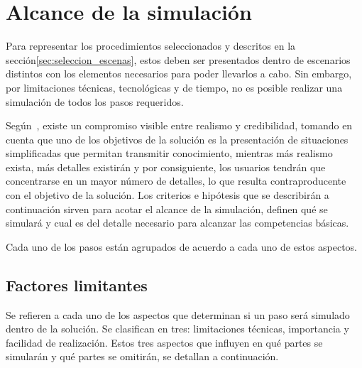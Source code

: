 \section{Alcance de la simulación}
\label{sec:alcance}

Para representar los procedimientos seleccionados y descritos en la
sección\ref{sec:seleccion_escenas}, estos deben ser presentados dentro de
escenarios distintos con los elementos necesarios para poder llevarlos a cabo.
Sin embargo, por limitaciones técnicas, tecnológicas y de tiempo, no es posible
realizar una simulación de todos los pasos requeridos.

Según~\cite{videojuegos:gonzaleztardon}, existe un compromiso visible entre
realismo y credibilidad, tomando en cuenta que uno de los objetivos de la
solución es la presentación de situaciones simplificadas que permitan transmitir
conocimiento, mientras más realismo exista, más detalles existirán y por
consiguiente, los usuarios tendrán que concentrarse en un mayor número de
detalles, lo que resulta contraproducente con el objetivo de la
solución\cite{videojuegos:gonzaleztardon}. Los criterios e hipótesis que se 
describirán a continuación sirven para acotar el
alcance de la simulación, definen qué se simulará y cual es del detalle
necesario para alcanzar las competencias básicas.


Cada uno de los pasos están agrupados de acuerdo a cada uno de estos aspectos.

\subsection{Factores limitantes}

Se refieren a cada uno de los aspectos que determinan si un paso 
será simulado dentro de la solución. Se clasifican en tres: limitaciones técnicas, 
importancia y facilidad de realización. Estos tres aspectos que influyen en qué partes 
se simularán y qué partes se omitirán, se detallan a continuación.


